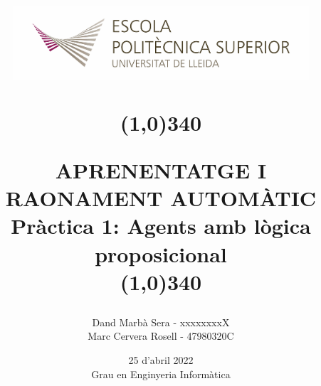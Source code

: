 \title{
	\begin{center}
	\vspace{3cm}
	\includegraphics[width=11cm, height=3cm]{images/Logo-nou-eps.jpg}
	\end{center}
	\begin{center}
	\line(1,0){340}
	\end{center}		
	APRENENTATGE I RAONAMENT AUTOMÀTIC\\
	\vspace{2mm}
	\Large Pràctica 1: Agents amb lògica proposicional\\
	\line(1,0){340}
	\vspace{2.5cm}
	}

\author{Dand Marbà Sera - xxxxxxxxX \\   Marc Cervera Rosell - 47980320C \vspace{1cm}}


\date{25 d'abril  2022\vspace{0.5cm} \\Grau en Enginyeria Informàtica}